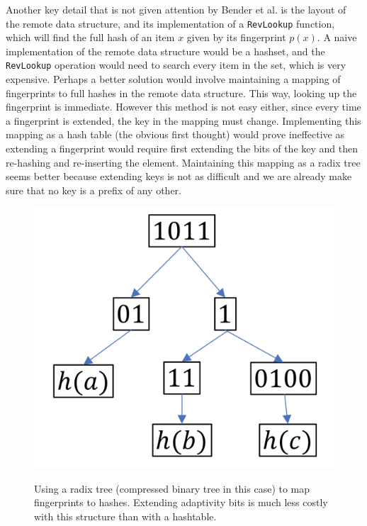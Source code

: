 \documentclass[../paper.tex]{subfiles}
\begin{document}
Another key detail that is not given attention by Bender et al. is the layout
of the remote data structure, and its implementation of a \texttt{RevLookup}
function, which will find the full hash of an item $x$ given by its fingerprint
$p(x)$. A naive implementation of the remote data structure would be a hashset,
and the \texttt{RevLookup} operation would need to search every item in the
set, which is very expensive. Perhaps a better solution would involve maintaining
a mapping of fingerprints to full hashes in the remote data structure. This
way, looking up the fingerprint is immediate. However this method is not easy
either, since every time a fingerprint is extended, the key in the mapping must change.
Implementing this mapping as a hash table (the obvious first thought) would prove
ineffective as extending a fingerprint would require first extending the bits of
the key and then re-hashing and re-inserting the element. Maintaining this mapping
as a radix tree seems better because extending keys is not as difficult and
we are already make sure that no key is a prefix of any other.

\begin{figure}
  \centering
    \includegraphics[scale=0.2]{radix_tree.png}
  \label{fig:radix_tree}
    \caption{Using a radix tree (compressed binary tree in this case) to map fingerprints
    to hashes. Extending adaptivity bits is much less costly with this structure than with
    a hashtable.}  
\end{figure}
\end{document}
